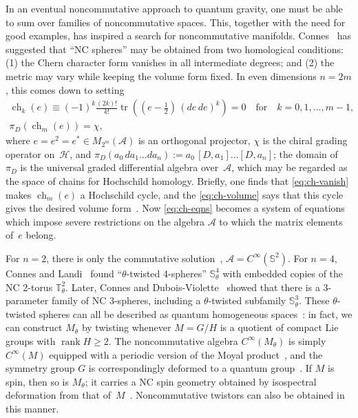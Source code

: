 \documentclass[a4paper,12pt]{article}
\newcommand{\A}{\mathcal{A}}        %
\DeclareMathOperator{\ch}{ch}       %
\newcommand{\Coo}{C^\infty}         %
\renewcommand{\H}{\mathcal{H}}      %
\DeclareMathOperator{\rank}{rank}   %
\newcommand{\sepword}[1]{\quad\text{#1}\quad} %
\newcommand{\Sf}{\mathbb{S}}        %
\newcommand{\T}{\mathbb{T}}         %
\newcommand{\thalf}{\tfrac{1}{2}}   %
\DeclareMathOperator{\tr}{tr}       %
\newcommand{\1}{\mathbf{1}}         %
\newcommand{\7}{\dagger}            %
\newcommand{\8}{\bullet}            %
\renewcommand{\.}{\cdot}            %
\renewcommand{\:}{\colon}           %
\begin{document}
In an eventual noncommutative approach to quantum gravity, one must be
able to sum over families of noncommutative spaces. This, together
with the need for good examples, has inspired a search for
noncommutative manifolds. Connes~\cite{ConnesSurvey} has suggested
that ``NC spheres'' may be obtained from two homological conditions:
(1) the Chern character form vanishes in all intermediate degrees; and
(2) the metric may vary while keeping the volume form fixed. In even
dimensions $n = 2m$, this comes down to setting
\begin{subequations}
\label{eq:ch-eqns}
\begin{gather}
\ch_k(e) \equiv (-1)^k \frac{(2k)!}{k!} \tr((e - \thalf)\,(de\,de)^k)
= 0 \sepword{for} k = 0,1,\dots,m-1,
\label{eq:ch-vanish}  \\
\pi_D(\ch_m(e)) = \chi,
\label{eq:ch-volume}
\end{gather}
\end{subequations}
where $e = e^2 = e^* \in M_{2^m}(\A)$ is an orthogonal projector,
$\chi$ is the chiral grading operator on~$\H$, and
$\pi_D(a_0\,da_1\dots da_n) := a_0\,[D,a_1]\dots [D,a_n]$; the domain
of~$\pi_D$ is the universal graded differential algebra over~$\A$,
which may be regarded as the space of chains for Hochschild homology.
Briefly, one finds that \eqref{eq:ch-vanish} makes $\ch_m(e)$ a
Hochschild cycle, and the \eqref{eq:ch-volume} says that this cycle
gives the desired volume form~\cite{ConnesGrav}. Now
\eqref{eq:ch-eqns} becomes a system of equations which impose severe
restrictions on the algebra $\A$ to which the matrix elements of~$e$
belong.

For $n = 2$, there is only the commutative
solution~\cite{ConnesSurvey}, $\A = \Coo(\Sf^2)$. For $n = 4$, Connes
and Landi~\cite{ConnesLa} found ``$\theta$-twisted 4-spheres''
$\Sf^4_\theta$ with embedded copies of the NC 2-torus $\T^2_\theta$.
Later, Connes and Dubois-Violette~\cite{ConnesDV} showed that there is
a 3-parameter family of NC 3-spheres, including a $\theta$-twisted
subfamily $\Sf^3_\theta$. These $\theta$-twisted spheres can all be
described as quantum homogeneous spaces~\cite{ConnesDV,Larissa}: in
fact, we can construct $M_\theta$ by twisting whenever $M = G/H$ is a
quotient of compact Lie groups with $\rank H \geq 2$. The
noncommutative algebra $\Coo(M_\theta)$ is simply $\Coo(M)$ equipped
with a periodic version of the Moyal product~\cite{RieffelDefQ}, and
the symmetry group $G$ is correspondingly deformed to a quantum
group~\cite{Larissa}. If $M$ is spin, then so is $M_\theta$; it
carries a NC spin geometry obtained by isospectral deformation from
that of~$M$~\cite{ConnesLa}. Noncommutative twistors can also be
obtained in this manner.
\end{document}
